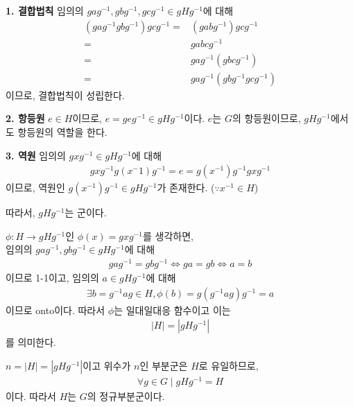 \documentclass{article}
\begin{document}
\textbf{1. 결합법칙} 임의의 $gag^{-1}, gbg^{-1}, gcg^{-1} \in gHg^{-1}$에 대해
\begin{align*}
(gag^{-1} gbg^{-1}) gcg^{-1} =& (gabg^{-1}) gcg^{-1}
\\ =& gabcg^{-1}
\\ =& gag^{-1} (gbcg^{-1})
\\ =& gag^{-1} (gbg^{-1} gcg^{-1})
\end{align*}이므로, 결합법칙이 성립한다.

\textbf{2. 항등원} $e \in H$이므로, $e = geg^{-1} \in gHg^{-1}$이다. $e$는 $G$의 항등원이므로, $gHg^{-1}$에서도 항등원의 역할을 한다.

\textbf{3. 역원} 임의의 $gxg^{-1} \in gHg^{-1}$에 대해
\begin{align*}
gxg^{-1} g(x^-1)g^{-1} = e = g(x^{-1})g^{-1} gxg^{-1}
\end{align*}이므로, 역원인 $g(x^{-1})g^{-1} \in gHg^{-1}$가 존재한다. ($\because x^{-1} \in H$)

따라서, $gHg^{-1}$는 군이다.

$\phi : H \rightarrow gHg^{-1}$인 $\phi(x) = gx g^{-1}$를 생각하면,
\\ 임의의 $gag^{-1}, gbg^{-1} \in gHg^{-1}$에 대해
\begin{align*}
gag^{-1} = gbg^{-1} \iff ga = gb  \iff a = b
\end{align*}이므로 1-1이고, 임의의 $a \in gHg^{-1}$에 대해
\begin{align*}
\exists b = g^{-1}ag \in H, \phi(b) = g (g^{-1} a g) g^{-1} = a
\end{align*}이므로 onto이다. 따라서 $\phi$는 일대일대응 함수이고 이는
\begin{align*}
\left|H\right| = \left|gHg^{-1}\right|
\end{align*} 를 의미한다.

$n = \left|H\right| = \left|gHg^{-1}\right|$이고 위수가 $n$인 부분군은 $H$로 유일하므로,
\begin{align*}
\forall g \in G \mid gHg^{-1} = H
\end{align*}이다. 따라서 $H$는 $G$의 정규부분군이다.
\end{document}
